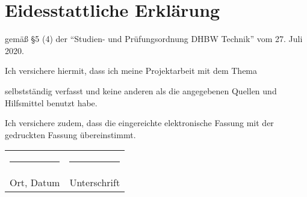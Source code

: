\chapter*{Eidesstattliche Erklärung}
\begin{center}
gemäß \S 5 (4) der "`Studien- und Prüfungsordnung DHBW Technik"' vom 27. Juli 2020.
\vspace{\baselineskip}

Ich versichere hiermit, dass ich meine Projektarbeit mit dem Thema
\vspace{\baselineskip}

\textbf{\titel}

\vspace{\baselineskip}

selbstständig verfasst und keine anderen als die angegebenen Quellen und Hilfsmittel benutzt habe.
\vspace{\baselineskip}

Ich versichere zudem, dass die eingereichte elektronische Fassung mit der gedruckten Fassung übereinstimmt.

\vspace{3cm}

\begin{tabular}{p{7.5cm}p{7.5cm}}
\rule{6cm}{0.4pt} & \rule{6cm}{0.4pt}\\
Ort, Datum & Unterschrift\\

\end{tabular}
\end{center}